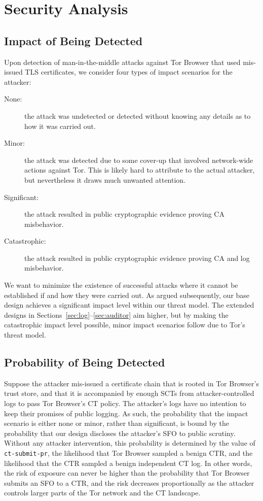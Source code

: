 \section{Security Analysis} \label{sec:analysis}

\subsection{Impact of Being Detected} \label{sec:analysis:impact}
Upon detection of man-in-the-middle attacks against Tor Browser that used 
mis-issued TLS certificates, we consider four types of impact scenarios for the
attacker:
\begin{description}
	\item[None:] the attack was undetected or detected without knowing any
		details as to how it was carried out.
	\item[Minor:] the attack was detected due to some cover-up that involved
		network-wide actions against Tor.  This is likely hard to attribute to
		the actual attacker, but nevertheless it draws much unwanted attention.
	\item[Significant:] the attack resulted in public cryptographic evidence
		proving CA misbehavior.
	\item[Catastrophic:] the attack resulted in public cryptographic evidence
		proving CA and log misbehavior.
\end{description}

We want to minimize the existence of successful attacks where it cannot be
established if and how they were carried out.  As argued subsequently, our
base design achieves a significant impact level within our threat model.  The
extended designs in Sections~\ref{sec:log}--\ref{sec:auditor} aim higher, but by
making the catastrophic impact level possible, minor impact scenarios follow due
to Tor's threat model.

\subsection{Probability of Being Detected} \label{sec:analysis:pr}
Suppose the attacker mis-issued a certificate chain that is rooted in Tor
Browser's trust store, and that it is accompanied by enough SCTs from
attacker-controlled logs to pass Tor Browser's CT policy.  The attacker's
logs have no intention to keep their promises of public logging.  As such, the
probability that the impact scenario is either none or minor, rather than
significant, is bound by the probability that our design discloses the
attacker's SFO to public scrutiny.  Without any attacker intervention, this
probability is determined by
	the value of \texttt{ct-submit-pr},
	the likelihood that Tor Browser sampled a benign CTR, and
	the likelihood that the CTR sampled a benign independent CT log.
In other words, the risk of exposure can never be higher than the probability
that Tor Browser submits an SFO to a CTR, and the risk decreases proportionally
as the attacker controls larger parts of the Tor network and the CT landscape.

